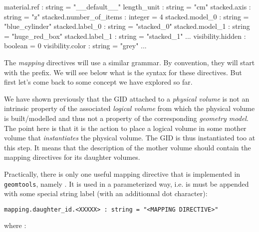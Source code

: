 \begin{ShellVerbatim}
[name="stacked_box" type="geomtools::stacked_model"]
material.ref            : string  = "__default__"
length_unit             : string  = "cm"
stacked.axis            : string  = "z"
stacked.number_of_items : integer = 4
stacked.model_0         : string  = "blue_cylinder"
stacked.label_0         : string  = "stacked_0"
stacked.model_1         : string  = "huge_red_box"
stacked.label_1         : string  = "stacked_1"
...
visibility.hidden       : boolean   = 0
visibility.color        : string    = "grey"
...
\end{ShellVerbatim}

The  \emph{mapping}  directives  will   use  a  similar  grammar.   By
convention, they will start with the  prefix. We will see
below what is  the syntax for these directives.   But first let's come
back to some concept we have explored so far.

We have  shown previously  that the GID  attached to  a \emph{physical
  volume} is not an intrinsic property of the associated \emph{logical
  volume} from  which the physical  volume is built/modelled  and thus
not a  property of the corresponding \emph{geometry  model}. The point
here is that it is the action to place a logical volume in some mother
volume that  \emph{instantiates} the physical volume. The  GID is thus
instantiated too at  this step.  It means that  the description of the
mother volume  should contain the mapping directives  for its daughter
volumes.

Practically,  there  is only  one  useful  mapping  directive that  is
implemented  in \texttt{geomtools},  namely .
It is used in a parameterized  way, i.e. is must be appended with some
special string label (with an additionnal dot character):
\begin{verbatim}
mapping.daughter_id.<XXXXX> : string = "<MAPPING DIRECTIVE>"
\end{verbatim}
\pn where :

